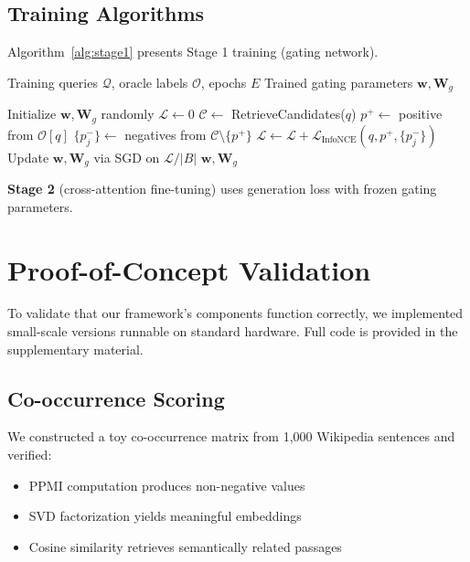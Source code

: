 \documentclass[10pt,twocolumn]{article}
\begin{document}
\subsection{Training Algorithms}

Algorithm~\ref{alg:stage1} presents Stage 1 training (gating network).

\begin{algorithm}[t]
\caption{Stage 1: Contrastive Gating Training}
\label{alg:stage1}
\begin{algorithmic}[1]
\REQUIRE Training queries $\mathcal{Q}$, oracle labels $\mathcal{O}$, epochs $E$
\ENSURE Trained gating parameters $\mathbf{w}, \mathbf{W}_g$

\STATE Initialize $\mathbf{w}, \mathbf{W}_g$ randomly
        \STATE $\mathcal{L} \leftarrow 0$
            \STATE $\mathcal{C} \leftarrow$ RetrieveCandidates($q$)
            \STATE $p^+ \leftarrow$ positive from $\mathcal{O}[q]$
            \STATE $\{p^-_j\} \leftarrow$ negatives from $\mathcal{C} \setminus \{p^+\}$
            \STATE $\mathcal{L} \leftarrow \mathcal{L} + \mathcal{L}_{\text{InfoNCE}}(q, p^+, \{p^-_j\})$
        \ENDFOR
        \STATE Update $\mathbf{w}, \mathbf{W}_g$ via SGD on $\mathcal{L}/|B|$
    \ENDFOR
\ENDFOR
\RETURN $\mathbf{w}, \mathbf{W}_g$
\end{algorithmic}
\end{algorithm}

\textbf{Stage 2} (cross-attention fine-tuning) uses generation loss with frozen gating parameters.

\section{Proof-of-Concept Validation}
\label{sec:poc}

To validate that our framework's components function correctly, we implemented small-scale versions runnable on standard hardware. Full code is provided in the supplementary material.

\subsection{Co-occurrence Scoring}

We constructed a toy co-occurrence matrix from 1,000 Wikipedia sentences and verified:
\begin{itemize}
    \item PPMI computation produces non-negative values
    \item SVD factorization yields meaningful embeddings
    \item Cosine similarity retrieves semantically related passages
\end{itemize}
\end{document}
